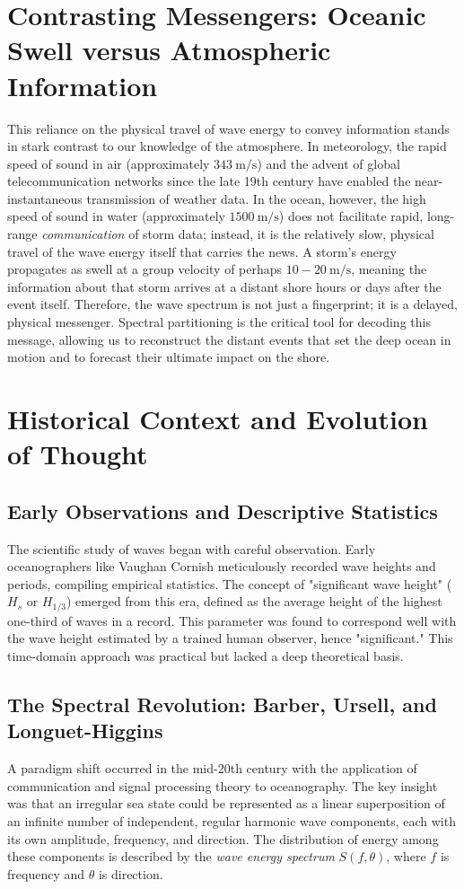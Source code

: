 \documentclass[11pt,letterpaper]{article}
\begin{document}
\section{Contrasting Messengers: Oceanic Swell versus Atmospheric Information}

This reliance on the physical travel of wave energy to convey information stands in stark contrast to our knowledge of the atmosphere. In meteorology, the rapid speed of sound in air (approximately $343\ \text{m/s}$) and the advent of global telecommunication networks since the late 19th century have enabled the near-instantaneous transmission of weather data. In the ocean, however, the high speed of sound in water (approximately $1500\ \text{m/s}$) does not facilitate rapid, long-range \textit{communication} of storm data; instead, it is the relatively slow, physical travel of the wave energy itself that carries the news. A storm's energy propagates as swell at a group velocity of perhaps $10-20\ \text{m/s}$, meaning the information about that storm arrives at a distant shore hours or days after the event itself. Therefore, the wave spectrum is not just a fingerprint; it is a delayed, physical messenger. Spectral partitioning is the critical tool for decoding this message, allowing us to reconstruct the distant events that set the deep ocean in motion and to forecast their ultimate impact on the shore.

\section{Historical Context and Evolution of Thought}
\subsection{Early Observations and Descriptive Statistics}
The scientific study of waves began with careful observation. Early oceanographers like Vaughan Cornish meticulously recorded wave heights and periods, compiling empirical statistics. The concept of "significant wave height" ($H_s$ or $H_{1/3}$) emerged from this era, defined as the average height of the highest one-third of waves in a record. This parameter was found to correspond well with the wave height estimated by a trained human observer, hence "significant." This time-domain approach was practical but lacked a deep theoretical basis.

\subsection{The Spectral Revolution: Barber, Ursell, and Longuet-Higgins}
A paradigm shift occurred in the mid-20th century with the application of communication and signal processing theory to oceanography. The key insight was that an irregular sea state could be represented as a linear superposition of an infinite number of independent, regular harmonic wave components, each with its own amplitude, frequency, and direction. The distribution of energy among these components is described by the \textit{wave energy spectrum} $S(f, \theta)$, where $f$ is frequency and $\theta$ is direction.
\end{document}
